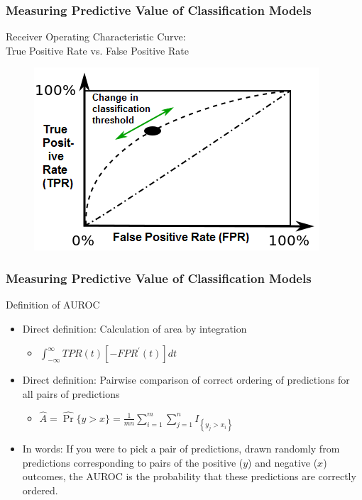\documentclass{beamer}
\begin{document}

\begin{frame}
\frametitle{Measuring Predictive Value of Classification Models}

Receiver Operating Characteristic Curve: \\
True Positive Rate vs. False Positive Rate
\begin{figure}
    \includegraphics[scale =  0.75 ]{Figs/ROC_curve_3.png}
\end{figure}

\end{frame}



\begin{frame}
\frametitle{Measuring Predictive Value of Classification Models}

Definition of AUROC
\begin{itemize}
    \item Direct definition: Calculation of area by integration
    \begin{itemize}
        \item $\int_{-\infty}^{\infty} TPR(t) [-FPR^{\prime}(t)] dt $
    \end{itemize}
    \item Direct definition: Pairwise comparison of correct ordering of predictions for all pairs of predictions %
    \begin{itemize}
        \item $\hat{A} = \hat{\Pr} \{ y > x \} = \frac{1}{m n} \sum_{i = 1}^{m} \sum_{j = 1}^{n} I_{\left\{ y_j > x_i \right\}}$
    \end{itemize}
    \item In words: If you were to pick a pair of predictions, drawn randomly from predictions corresponding to pairs of the positive ($y$) and negative ($x$) outcomes, the AUROC is the probability that these predictions are correctly ordered.
\end{itemize}

\end{frame}
\end{document}
